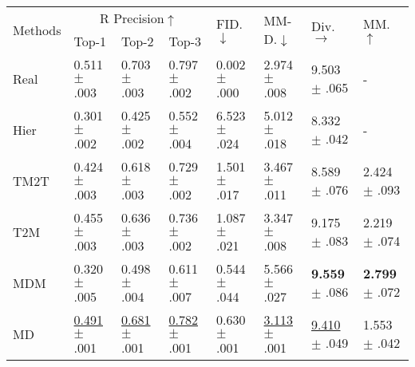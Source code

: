 \documentclass[10pt,twocolumn,letterpaper]{article}
\begin{document}
\begin{table*}[ht]

\begin{center}
\begin{tabular}{p{2.15cm}p{1.70cm}p{1.70cm}p{1.70cm}p{1.70cm}p{1.70cm}p{1.70cm}p{1.70cm}}
\hline
\multirow{2}{*}{Methods}&\multicolumn{3}{c}{R Precision$\uparrow$}&\multirow{2}{*}{FID.$\downarrow$}&\multirow{2}{*}{MM-D.$\downarrow$}& \multirow{2}{*}{Div.$\rightarrow$}& \multirow{2}{*}{MM.$\uparrow$}\\ \cline{2-4}
& Top-1& Top-2& Top-3&&&&\\
\hline

 Real& 0.511 \scriptsize $\pm$ .003& 0.703  \scriptsize $\pm$ .003& 0.797  \scriptsize $\pm$ .002& 0.002  \scriptsize $\pm$ .000&2.974  \scriptsize $\pm$ .008 &9.503 \scriptsize $\pm$ .065 &-\\
 \hline

Hier~\cite{ghosh2021synthesis} & 0.301 \scriptsize $\pm$ .002& 0.425  \scriptsize $\pm$ .002& 0.552  \scriptsize $\pm$ .004& 6.523  \scriptsize $\pm$ .024&5.012  \scriptsize $\pm$ .018 &8.332 \scriptsize $\pm$ .042 &-\\

TM2T~\cite{guo2022tm2t} & 0.424 \scriptsize $\pm$ .003& 0.618  \scriptsize $\pm$ .003& 0.729  \scriptsize $\pm$ .002& 1.501  \scriptsize $\pm$ .017&3.467  \scriptsize $\pm$ .011 &8.589 \scriptsize $\pm$ .076 &2.424 \scriptsize $\pm$ .093\\

T2M~\cite{guo2022generating} & 0.455 \scriptsize $\pm$ .003& 0.636  \scriptsize $\pm$ .003& 0.736  \scriptsize $\pm$ .002& 1.087  \scriptsize $\pm$ .021&3.347  \scriptsize $\pm$ .008 &9.175 \scriptsize $\pm$ .083 &2.219 \scriptsize $\pm$ .074\\

MDM~\cite{tevet2023human} & 0.320 \scriptsize $\pm$ .005& 0.498  \scriptsize $\pm$ .004& 0.611  \scriptsize $\pm$ .007& 0.544  \scriptsize $\pm$ .044&5.566 \scriptsize $\pm$ .027 &\textbf{9.559} \scriptsize $\pm$ .086 &\textbf{2.799} \scriptsize $\pm$ .072\\

MD~\cite{zhang2022motiondiffuse} & \underline{0.491} \scriptsize $\pm$ .001& \underline{0.681}  \scriptsize $\pm$ .001& \underline{0.782}  \scriptsize $\pm$ .001& 0.630  \scriptsize $\pm$ .001&\underline{3.113}  \scriptsize $\pm$ .001 &\underline{9.410} \scriptsize $\pm$ .049 &1.553 \scriptsize $\pm$ .042\\


\end{tabular}
\end{center}
\end{table*}
\end{document}
